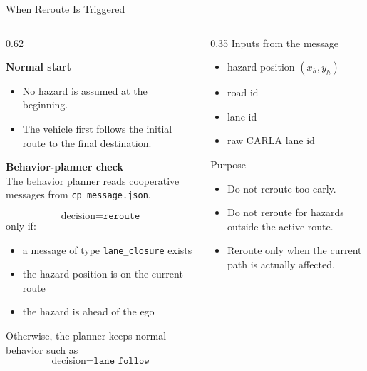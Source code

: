 \documentclass[aspectratio=169]{beamer}
\begin{document}
\begin{frame}{When Reroute Is Triggered}
\small
\begin{columns}[T,onlytextwidth]
\begin{column}{0.62\textwidth}
\begin{flushleft}
\textbf{Normal start}\\[0.3em]
\begin{itemize}
\setlength\itemsep{0.3em}
\item No hazard is assumed at the beginning.
\item The vehicle first follows the initial route to the final destination.
\end{itemize}

\textbf{Behavior-planner check}\\[0.3em]
The behavior planner reads cooperative messages from \texttt{cp\_message.json}.

\[
\text{decision}=\texttt{reroute}
\]
only if:
\begin{itemize}
\setlength\itemsep{0.3em}
\item a message of type \texttt{lane\_closure} exists
\item the hazard position is on the current route
\item the hazard is ahead of the ego
\end{itemize}

Otherwise, the planner keeps normal behavior such as
\[
\text{decision}=\texttt{lane\_follow}
\]
\end{flushleft}
\end{column}

\begin{column}{0.35\textwidth}
Inputs from the message
\begin{itemize}
\setlength\itemsep{0.3em}
\item hazard position $(x_h,y_h)$
\item road id
\item lane id
\item raw CARLA lane id
\end{itemize}

Purpose
\begin{itemize}
\setlength\itemsep{0.3em}
\item Do not reroute too early.
\item Do not reroute for hazards outside the active route.
\item Reroute only when the current path is actually affected.
\end{itemize}
\end{column}
\end{columns}
\end{frame}
\end{document}
